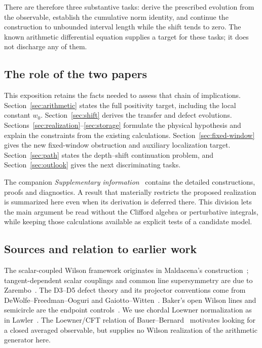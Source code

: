 There are therefore three substantive tasks: derive the prescribed
evolution from the observable, establish the cumulative norm
identity, and continue the construction to unbounded interval
length while the shift tends to zero. The known arithmetic
differential equation supplies a target for these tasks; it does
not discharge any of them.

\subsection{The role of the two papers}

This exposition retains the facts needed to assess that chain of
implications. Section~\ref{sec:arithmetic} states the full positivity
target, including the local constant $w_0$.
Section~\ref{sec:shift} derives the transfer and defect evolutions.
Sections~\ref{sec:realization}--\ref{sec:storage} formulate the
physical hypothesis and explain the constraints from the existing
calculations. Section~\ref{sec:fixed-window} gives the new fixed-window obstruction
and auxiliary localization target. Section~\ref{sec:path} states the depth--shift
continuation problem, and Section~\ref{sec:outlook} gives the next
discriminating tasks.

The companion \emph{Supplementary information}~\cite{Supplement}
contains the detailed constructions, proofs and diagnostics.
A result that materially restricts the proposed realization is
summarized here even when its derivation is deferred there.
This division lets the main argument be read without the Clifford
algebra or perturbative integrals, while keeping those calculations
available as explicit tests of a candidate model.

\subsection{Sources and relation to earlier work}

The scalar-coupled Wilson framework originates in
Maldacena's construction~\cite{Maldacena}; tangent-dependent scalar
couplings and common line supersymmetry are due to
Zarembo~\cite{Zarembo}. The D3--D5 defect theory and its projector
conventions come from DeWolfe--Freedman--Ooguri and
Gaiotto--Witten~\cite{DFO,GW}. Baker's open Wilson lines and
semicircle are the endpoint controls~\cite{Baker}.
We use chordal Loewner normalization as in Lawler~\cite{Lawler}.
The Loewner/CFT relation of Bauer--Bernard~\cite{BauerBernard}
motivates looking for a closed averaged observable, but supplies
no Wilson realization of the arithmetic generator here.

